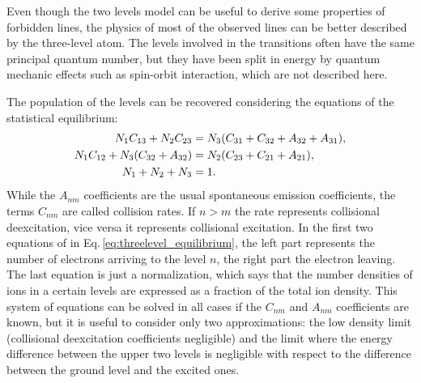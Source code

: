 \documentclass[../thesis.tex]{subfiles}
\begin{document}
Even though the two levels model can be useful to derive some properties of forbidden lines, the physics of most of the observed lines can be better described by the three-level atom.
The levels involved in the transitions often have the same principal quantum number, but they have been split in energy by quantum mechanic effects such as spin-orbit interaction, which are not described here.

The population of the levels can be recovered considering the equations of the statistical equilibrium:
\begin{align}
    \label{eq:threelevel_equilibrium}
    N_1 C_{13}+N_2 C_{23} &= N_3(C_{31}+C_{32}+A_{32}+A_{31}), \notag\\
    N_1 C_{12}+N_3(C_{32}+A_{32}) &= N_2(C_{23}+C_{21}+A_{21}),\\
    N_1+N_2+N_3 &= 1. \notag
\end{align}
While the $A_{nm}$ coefficients are the usual spontaneous emission coefficients, the terms $C_{nm}$ are called collision rates.
If $n>m$ the rate represents collisional deexcitation, vice versa it represents collisional excitation.
In the first two equations of in Eq.\,\ref{eq:threelevel_equilibrium}, the left part represents the number of electrons arriving to the level $n$, the right part the electron leaving.
The last equation is just a normalization, which says that the number densities of ions in a certain levels are expressed as a fraction of the total ion density.
This system of equations can be solved in all cases if the $C_{nm}$ and $A_{nm}$ coefficients are known, but it is useful to consider only two approximations: the low density limit (collisional deexcitation coefficients negligible) and the limit where the energy difference between the upper two levels is negligible with respect to the difference between the ground level and the excited ones.
\end{document}
